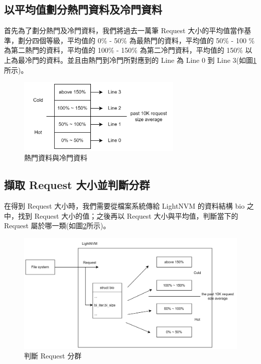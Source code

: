 \subsection{以平均值劃分熱門資料及冷門資料}\label{s3.2.1}
\indent
首先為了劃分熱門及冷門資料，我們將過去一萬筆 Request 大小的平均值當作基準，劃分四個等級，平均值的 0\% - 50\% 為最熱門的資料，平均值的 50\% - 100 \% 為第二熱門的資料，平均值的 100\% - 150\% 為第二冷門資料，平均值的 150\% 以上為最冷門的資料。並且由熱門到冷門所對應到的 Line 為 Line 0 到 Line 3(如圖\ref{f3.5}所示)。
\begin{figure}[H]
    \centering
    \includegraphics[width=0.7\textwidth]{picture/ch3/hot_cold.png}
    \caption{熱門資料與冷門資料}
    \label{f3.5}
\end{figure}

\subsection{擷取 Request 大小並判斷分群}\label{s3.2.2}
\indent
在得到 Request 大小時，我們需要從檔案系統傳給 LightNVM 的資料結構 bio 之中，找到 Request 大小的值；之後再以 Request 大小與平均值，判斷當下的 Request 屬於哪一類(如圖\ref{f3.6}所示)。
\begin{figure}[H]
    \centering
    \includegraphics[width=1\textwidth]{picture/ch3/get_rq_size_hot_cold.png}
    \caption{判斷 Request 分群}
    \label{f3.6}
\end{figure}


